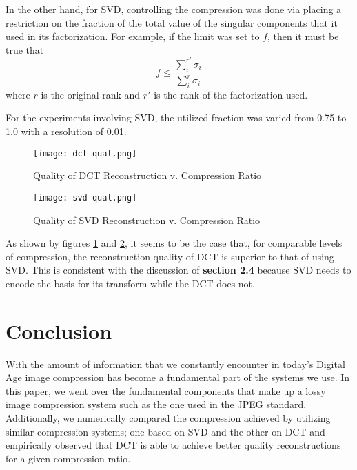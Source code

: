 \documentclass[review,onefignum,onetabnum]{siamart190516}
\begin{document}
In the other hand, for SVD, controlling the compression was done via placing a
restriction on the fraction of the total value of the singular components that it used in
its factorization. For example, if the limit was set to $f$, then it must be true that
$$f \leq \frac{\sum_i^{r'} \sigma_i}{\sum_i^r \sigma_i}$$
where $r$ is the original rank and $r'$ is the rank of the factorization used.

For the experiments involving SVD, the utilized fraction was varied from 0.75 to 1.0
with a resolution of 0.01.

\begin{figure}[H]
  \centering
  \texttt{[image: dct qual.png]}
  \caption{Quality of DCT Reconstruction v. Compression Ratio}
  \label{fig:dctqual}
\end{figure}

\begin{figure}[H]
  \centering
  \texttt{[image: svd qual.png]}
  \caption{Quality of SVD Reconstruction v. Compression Ratio}
  \label{fig:svdqual}
\end{figure}

As shown by figures \ref{fig:dctqual} and \ref{fig:svdqual}, it seems to be the case
that, for comparable levels of compression, the reconstruction quality of 
DCT is superior to that of using SVD. This is consistent with
the discussion of \textbf{section 2.4} because SVD needs to encode the basis for 
its transform while the DCT does not.

\section{Conclusion}
With the amount of information that we constantly encounter in today's Digital Age
image compression has become a fundamental part of the systems we use. In this paper,
we went over the fundamental components that make up a lossy image compression system
such as the one used in the JPEG standard. Additionally, we numerically compared 
the compression achieved by utilizing similar compression systems; one based on SVD
and the other on DCT and empirically observed that DCT is able to achieve better 
quality reconstructions for a given compression ratio.

\pagebreak


\end{document}
